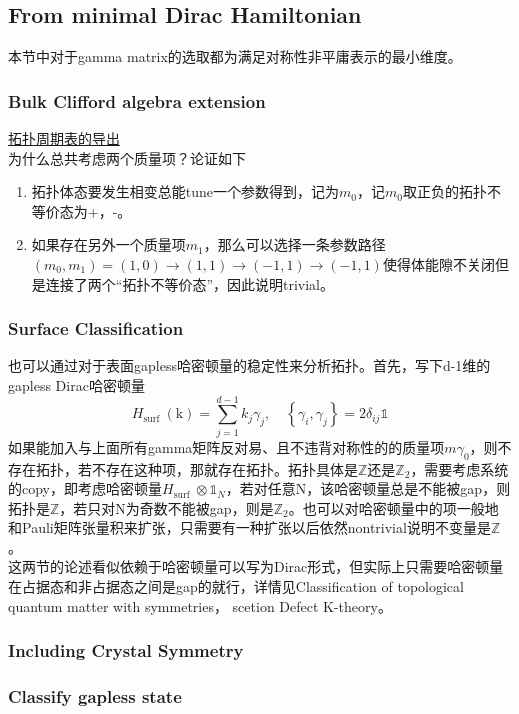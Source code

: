 \documentclass[10pt,openany]{book}
\theoremstyle{thmstyle} %
\theoremstyle{defstyle} %
\theoremstyle{prostyle} %
\begin{document}
\subsection{From minimal Dirac Hamiltonian}
本节中对于gamma matrix的选取都为满足对称性非平庸表示的最小维度。
\subsubsection{Bulk Clifford algebra extension}
\href{https://zhuanlan.zhihu.com/p/33923555}{拓扑周期表的导出}\\
为什么总共考虑两个质量项？论证如下

\begin{enumerate}
  \item 拓扑体态要发生相变总能tune一个参数得到，记为$ m_0 $，记$ m_0 $取正负的拓扑不等价态为+，-。
  \item 如果存在另外一个质量项$ m_1 $，那么可以选择一条参数路径$ (m_0,m_1) = (1,0)\to(1,1)\to(-1,1)\to(-1,1) $使得体能隙不关闭但是连接了两个“拓扑不等价态”，因此说明trivial。
\end{enumerate}
\subsubsection{Surface Classification }
也可以通过对于表面gapless哈密顿量的稳定性来分析拓扑。首先，写下d-1维的gapless Dirac哈密顿量
\begin{equation}
  H_{\text {surf }}(\mathrm{k})=\sum_{j=1}^{d-1} k_j \gamma_j, \quad\left\{\gamma_i, \gamma_j\right\}=2 \delta_{i j} \mathbb{1}
\end{equation}
如果能加入与上面所有gamma矩阵反对易、且不违背对称性的的质量项$ m \gamma_0 $，则不存在拓扑，若不存在这种项，那就存在拓扑。拓扑具体是$ \mathbb{Z} $还是$ \mathbb{Z}_2 $，需要考虑系统的copy，即考虑哈密顿量$ H_{\text {surf }} \otimes \mathbb{1}_N $，若对任意N，该哈密顿量总是不能被gap，则拓扑是$\mathbb{Z}$，若只对N为奇数不能被gap，则是$ \mathbb{Z}_2 $。也可以对哈密顿量中的项一般地和Pauli矩阵张量积来扩张，只需要有一种扩张以后依然nontrivial说明不变量是$ \mathbb{Z} $。\\
这两节的论述看似依赖于哈密顿量可以写为Dirac形式，但实际上只需要哈密顿量在占据态和非占据态之间是gap的就行，详情见Classification of topological quantum matter with symmetries， scetion Defect K-theory。
\subsubsection{Including Crystal Symmetry}
\subsubsection{Classify gapless state}
\end{document}
